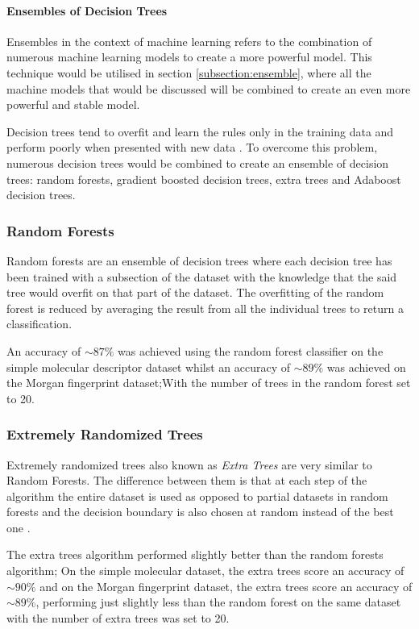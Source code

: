 \documentclass[a4paper,12pt]{report}
\begin{document}
			\paragraph{Ensembles of Decision Trees}
			Ensembles in the context of machine learning refers to the combination of numerous machine learning models to create a more powerful model. This technique would be utilised in section \ref{subsection:ensemble}, where all the machine models that would be discussed will be combined to create an even more powerful and stable model.
			
			Decision trees tend to overfit and learn the rules only in the training data and perform poorly when presented with new data \cite{Mueller2016}. To overcome this problem, numerous decision trees would be combined to create an ensemble of decision trees: random forests, gradient boosted decision trees, extra trees and Adaboost decision trees.
			\subsubsection{Random Forests}
			Random forests are an ensemble of decision trees where each decision tree has been trained with a subsection of the dataset with the knowledge that the said tree would overfit on that part of the dataset. The overfitting of the random forest is reduced by averaging the result from all the individual trees to return a classification.
			
			An accuracy of $\sim87\%$ was achieved using the random forest classifier on the simple molecular descriptor dataset whilst an accuracy of $\sim89\%$ was achieved on the Morgan fingerprint dataset;With the number of trees in the random forest set to 20.
				
			\subsubsection{Extremely Randomized Trees}
			Extremely randomized trees also known as \textit{Extra Trees} are very similar to Random Forests. The difference between them is that at each step of the algorithm the entire dataset is used as opposed to partial datasets in random forests and the decision boundary is also chosen at random instead of the best one \cite{Pierre2006}.
			
			The extra trees algorithm performed slightly better than the random forests algorithm; On the simple molecular dataset, the extra trees score an accuracy of $\sim90\%$ and on the Morgan fingerprint dataset, the extra trees score an accuracy of $\sim89\%$, performing just slightly less than the random forest on the same dataset with the number of extra trees was set to 20.
			
\end{document}
